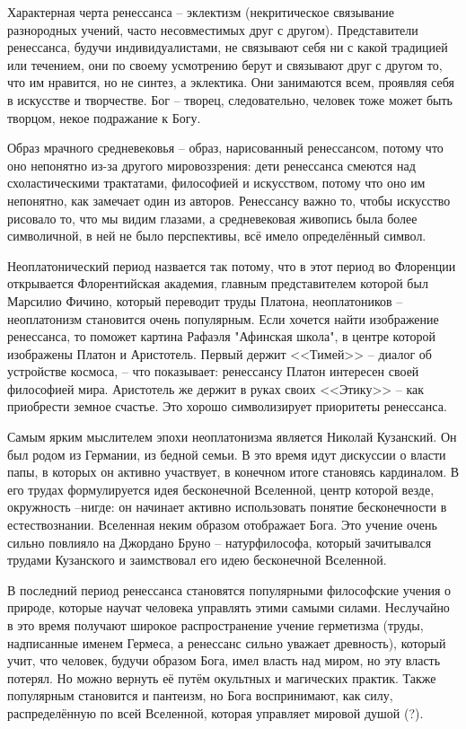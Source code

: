 \documentclass[a4paper, 12pt]{book} %
\begin{document}
Характерная черта ренессанса -- эклектизм (некритическое связывание разнородных учений, часто несовместимых друг с другом). Представители ренессанса, будучи индивидуалистами, не связывают себя ни с какой традицией или течением, они по своему усмотрению берут и связывают друг с другом то, что им нравится, но не синтез, а эклектика. Они занимаются всем, проявляя себя в искусстве и творчестве.	 Бог -- творец, следовательно, человек тоже может быть творцом, некое подражание к Богу.

Образ мрачного средневековья -- образ, нарисованный ренессансом, потому что оно непонятно из-за другого мировоззрения: дети ренессанса смеются над схоластическими трактатами, философией и искусством, потому что оно им непонятно, как замечает один из авторов. Ренессансу важно то, чтобы искусство рисовало то, что мы видим глазами, а средневековая живопись была более символичной, в ней не было перспективы, всё имело определённый символ.

Неоплатонический период назвается так потому, что в этот период во Флоренции открывается Флорентийская академия, главным представителем которой был Марсилио Фичино, который переводит труды Платона, неоплатоников -- неоплатонизм становится очень популярным. Если хочется найти изображение ренессанса, то поможет картина Рафаэля "Афинская школа", в центре которой изображены Платон и Аристотель. Первый держит <<Тимей>> -- диалог об устройстве космоса, -- что показывает: ренессансу Платон интересен своей философией мира. Аристотель же держит в руках своих <<Этику>> -- как приобрести земное счастье. Это хорошо символизирует приоритеты ренессанса.

Самым ярким мыслителем эпохи неоплатонизма является Николай Кузанский. Он был родом из Германии, из бедной семьи. В это время идут дискуссии о власти папы, в которых он активно участвует, в конечном итоге становясь кардиналом. В его трудах формулируется идея бесконечной Вселенной, центр которой везде, окружность --нигде: он начинает активно использовать понятие бесконечности в естествознании. Вселенная неким образом отображает Бога. Это учение очень сильно повлияло на Джордано Бруно -- натурфилософа, который зачитывался трудами Кузанского и заимствовал его идею бесконечной Вселенной.

В последний период ренессанса становятся популярными философские учения о природе, которые научат человека управлять этими самыми силами. Неслучайно в это время получают широкое распространение учение герметизма (труды, надписанные именем Гермеса, а ренессанс сильно уважает древность), который учит, что человек, будучи образом Бога, имел власть над миром, но эту власть потерял. Но можно вернуть её путём окультных и магических практик. Также популярным становится и пантеизм, но Бога воспринимают, как силу, распределённую по всей Вселенной, которая управляет мировой душой (?). 
\end{document}

